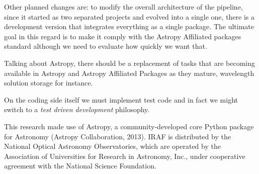 \documentclass[11pt,twoside]{article}
\begin{document}
Other planned changes are: to modify the overall architecture of the pipeline,
since it started as two separated projects and evolved into a single one, there
is a development version that integrates everything as a single package. The 
ultimate goal in this regard is to make it comply with the Astropy Affiliated
packages standard although we need to evaluate how quickly we want that.

Talking about Astropy, there should be a replacement of tasks that are becoming
available in Astropy and Astropy Affiliated Packages as they mature, wavelength
solution storage for instance.

On the coding side itself we must implement test code and in fact we might switch
to a \emph{test driven development} philosophy.

\acknowledgements  This research made use of Astropy, a community-developed core Python package for Astronomy (Astropy Collaboration, 2013). IRAF is distributed by the National Optical Astronomy Observatories, which are operated by the Association of Universities for Research in Astronomy, Inc., under cooperative agreement with the National Science Foundation.


\end{document}
